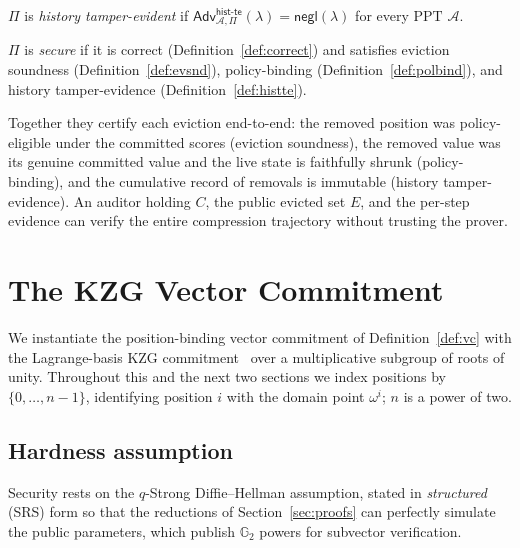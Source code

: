 \documentclass[version=submission]{iacrcc}
\theoremstyle{definition}
\newcommand{\secpar}{\lambda}
\newcommand{\negl}{\mathsf{negl}}
\newcommand{\PPT}{\mathrm{PPT}}
\newcommand{\Adv}{\mathsf{Adv}}
\newcommand{\Evicted}{E}
\newcommand{\A}{\mathcal{A}}
\newcommand{\GG}{\mathbb{G}}
\newcommand{\histte}{\mathsf{hist\text{-}te}}
\begin{document}
\begin{definition}\label{def:histte}
$\Pi$ is \emph{history tamper-evident} if
$\Adv^{\histte}_{\A,\Pi}(\secpar)=\negl(\secpar)$ for every $\PPT$ $\A$.
\end{definition}

\begin{definition}\label{def:secure}
$\Pi$ is \emph{secure} if it is correct (Definition~\ref{def:correct}) and
satisfies eviction soundness (Definition~\ref{def:evsnd}), policy-binding
(Definition~\ref{def:polbind}), and history tamper-evidence
(Definition~\ref{def:histte}).
\end{definition}

\begin{remark}
Together they certify each eviction end-to-end: the removed position was
policy-eligible under the committed scores (eviction soundness), the removed
value was its genuine committed value and the live state is faithfully shrunk
(policy-binding), and the cumulative record of removals is immutable (history
tamper-evidence). An auditor holding $C$, the public evicted set $\Evicted$, and
the per-step evidence can verify the entire compression trajectory without
trusting the prover.
\end{remark}

\section{The KZG Vector Commitment}\label{sec:kzgvc}

We instantiate the position-binding vector commitment of
Definition~\ref{def:vc} with the Lagrange-basis KZG commitment~\cite{kzg} over a
multiplicative subgroup of roots of unity. Throughout this and the next two
sections we index positions by $\{0,\dots,n-1\}$, identifying position $i$ with
the domain point $\omega^{i}$; $n$ is a power of two.

\subsection{Hardness assumption}

Security rests on the $q$-Strong Diffie--Hellman assumption, stated in
\emph{structured} (SRS) form so that the reductions of
Section~\ref{sec:proofs} can perfectly simulate the public parameters, which
publish $\GG_2$ powers for subvector verification.
\end{document}
